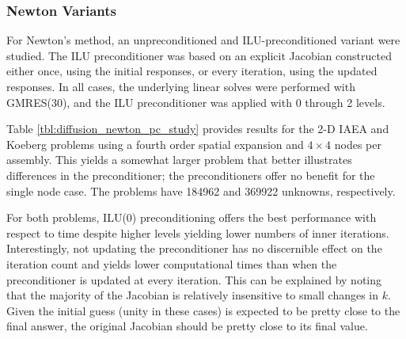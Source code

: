 \subsubsection{Newton Variants}

For Newton's method, an unpreconditioned 
and ILU-preconditioned variant were studied.  The ILU preconditioner 
was based on an explicit Jacobian constructed either once, using the 
initial responses, or every iteration, using the updated responses.  
In all cases, the underlying linear solves were performed with GMRES(30),
and the ILU preconditioner was applied with 0 through 2 levels.

Table \ref{tbl:diffusion_newton_pc_study} provides results for the 
2-D IAEA and Koeberg problems using a fourth order spatial 
expansion and $4\times 4$ nodes per assembly.  This yields a 
somewhat larger problem that better illustrates differences 
in the preconditioner; the preconditioners offer no benefit 
for the single node case.  The problems have 184962 and 
369922 unknowns, respectively.

For both problems, ILU(0) preconditioning offers the best performance
with respect to time despite higher levels yielding lower numbers of 
inner iterations.
Interestingly, not updating the preconditioner has no discernible effect 
on the iteration count and yields lower computational times than when 
the preconditioner is updated at every iteration.  This can be explained 
by noting that the majority of the Jacobian is relatively insensitive 
to small changes in $k$.  Given the initial guess (unity in these cases)
is expected to be pretty close to the final answer, the original Jacobian
should be pretty close to its final value.


